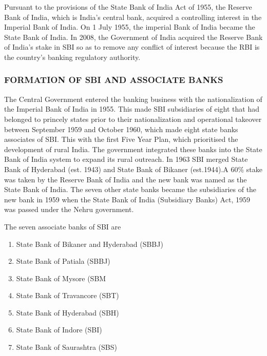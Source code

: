 \documentclass[a4paper, 12pt]{extarticle}
\begin{document}
{\par Pursuant to the provisions of the State Bank of India Act of 1955, the Reserve Bank of India, which is India's central bank, acquired a controlling interest in the Imperial Bank of India. On 1 July 1955, the imperial Bank of India became the State Bank of India. In 2008, the Government of India acquired the Reserve Bank of India's stake in SBI so as to remove any conflict of interest because the RBI is the country's banking regulatory authority.

\subsubsection{FORMATION OF SBI AND ASSOCIATE BANKS}
\par The Central Government entered the banking business with the nationalization of the Imperial Bank of India in 1955. This made SBI subsidiaries of eight that had belonged to princely states prior to their nationalization and operational takeover between September 1959 and October 1960, which made eight state banks associates of SBI. This with the first Five Year Plan, which prioritised the development of rural India. The government integrated these banks into the State Bank of India system to expand its rural outreach. In 1963 SBI merged State Bank of Hyderabad (est. 1943) and State Bank of Bikaner (est.1944).A 60\% stake was taken by the Reserve Bank of India and the new bank was named as the State Bank of India. The seven other state banks became the subsidiaries of the new bank in 1959 when the State Bank of India (Subsidiary Banks) Act, 1959 was passed under the Nehru government.

The seven associate banks of SBI are
\begin{enumerate}
\item State Bank of Bikaner and Hyderabad (SBBJ)
\item State Bank of Patiala (SBBJ)
\item State Bank of Mysore (SBM
\item State Bank of Travancore (SBT)
\item State Bank of Hyderabad (SBH)
\item State Bank of Indore (SBI)
\item State Bank of Saurashtra (SBS)
\end{enumerate}

}
\end{document}
